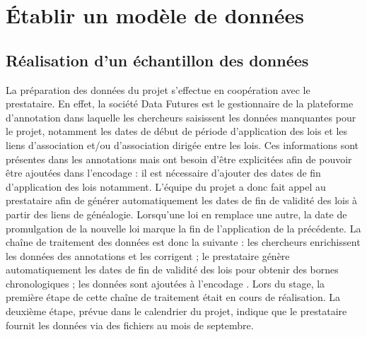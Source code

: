 \section{Établir un modèle de données}
    \subsection{Réalisation d'un échantillon des données}

La préparation des données du projet \COREL s'effectue en coopération avec le prestataire. En effet, la société Data Futures est le gestionnaire de la plateforme d'annotation dans laquelle les chercheurs saisissent les données manquantes pour le projet, notamment les dates de début de période d'application des lois et les liens d'association et/ou d'association dirigée entre les lois. Ces informations sont présentes dans les annotations mais ont besoin d'être explicitées afin de pouvoir être ajoutées dans l'encodage : il est nécessaire d'ajouter des dates de fin d'application des lois notamment. L'équipe du projet a donc fait appel au prestataire afin de générer automatiquement les dates de fin de validité des lois à partir des liens de généalogie. Lorsqu'une loi en remplace une autre, la date de promulgation de la nouvelle loi marque la fin de l'application de la précédente. La chaîne de traitement des données est donc la suivante : les chercheurs enrichissent les données des annotations et les corrigent ; le prestataire génère automatiquement les dates de fin de validité des lois pour obtenir des bornes chronologiques ; les données sont ajoutées à l'encodage \TEI. Lors du stage, la première étape de cette chaîne de traitement était en cours de réalisation. La deuxième étape, prévue dans le calendrier du projet, indique que le prestataire fournit les données via des fichiers \JSON au mois de septembre. 

